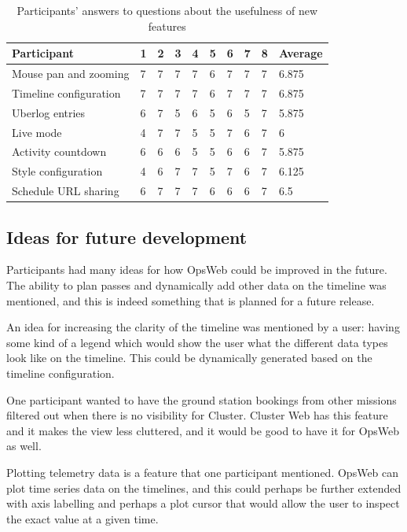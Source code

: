 \begin{table}[!h]
\def\arraystretch{1.1}%
    \begin{center}
    \caption{Participants' answers to questions about the usefulness of new features}
    \label{features_usefulness}
    \begin{tabular}{| l | l | l | l | l | l | l | l | l | l | }
    \hline
    Participant & 1 & 2 & 3 & 4 & 5 & 6 & 7 & 8 & Average  \\
    \hline
    Mouse pan and zooming    & 7  & 7 & 7 & 7 & 6 & 7 & 7 & 7 & 6.875   \\
    Timeline configuration    & 7  & 7 & 7 & 7 & 6 & 7 & 7 & 7 & 6.875    \\
    Uberlog entries    &  6 & 7 & 5 & 6 & 5 & 6 & 5 & 7 & 5.875   \\
    Live mode    & 4  & 7 & 7 & 5 & 5 & 7 & 6 & 7 & 6   \\
    Activity countdown    & 6  & 6 & 6 & 5 & 5 & 6 & 6 & 7 & 5.875   \\
    Style configuration    & 4  & 6 & 7 & 7 & 5 & 7 & 6 & 7 & 6.125   \\
    Schedule URL sharing    & 6  & 7 & 7 & 7 & 6 & 6 & 6 & 7 & 6.5   \\
    \hline
    \end{tabular}
    \end{center}
\end{table}

\subsection{Ideas for future development}
Participants had many ideas for how OpsWeb could be improved in the future. The ability to plan passes and dynamically add other data on the timeline was mentioned, and this is indeed something that is planned for a future release.

An idea for increasing the clarity of the timeline was mentioned by a user: having some kind of a legend which would show the user what the different data types look like on the timeline. This could be dynamically generated based on the timeline configuration.

One participant wanted to have the ground station bookings from other missions filtered out when there is no visibility for Cluster. Cluster Web has this feature and it makes the view less cluttered, and it would be good to have it for OpsWeb as well.

Plotting telemetry data is a feature that one participant mentioned. OpsWeb can plot time series data on the timelines, and this could perhaps be further extended with axis labelling and perhaps a plot cursor that would allow the user to inspect the exact value at a given time.


